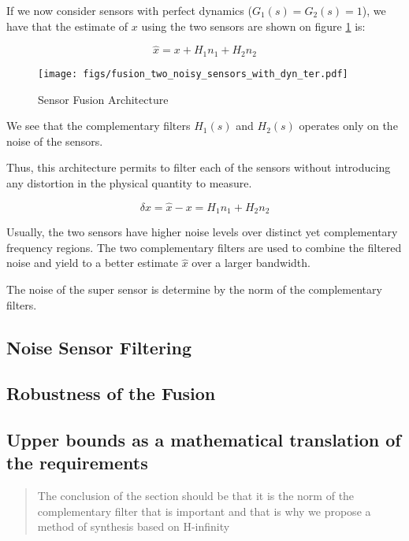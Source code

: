 \documentclass[9pt, technote, a4paper]{ieeeconf}
\begin{document}
If we now consider sensors with perfect dynamics (\(G_1(s) = G_2(s) = 1\)), we have that the estimate of \(x\) using the two sensors are shown on figure \ref{fig:fusion_two_noisy_sensors_with_dyn_ter} is:

\begin{equation}
  \hat{x} = x + H_1 n_1 + H_2 n_2
\end{equation}

\begin{figure}[htbp]
\centering
\texttt{[image: figs/fusion\_two\_noisy\_sensors\_with\_dyn\_ter.pdf]}
\caption{\label{fig:fusion_two_noisy_sensors_with_dyn_ter}
Sensor Fusion Architecture}
\end{figure}

We see that the complementary filters \(H_1(s)\) and \(H_2(s)\) operates only on the noise of the sensors.

Thus, this architecture permits to filter each of the sensors without introducing any distortion in the physical quantity to measure.

\begin{equation}
  \delta x = \hat{x} - x = H_1 n_1 + H_2 n_2
\end{equation}

Usually, the two sensors have higher noise levels over distinct yet complementary frequency regions. The two complementary filters are used to combine the filtered noise and yield to a better estimate \(\hat{x}\) over a larger bandwidth.

The noise of the super sensor is determine by the norm of the complementary filters.

\subsection{Noise Sensor Filtering}
\label{sec:orgce86efa}


\subsection{Robustness of the Fusion}
\label{sec:orgc52988d}


\subsection{Upper bounds as a mathematical translation of the requirements}
\label{sec:org4ab877a}
\begin{quote}
The conclusion of the section should be that it is the norm of the complementary filter that is important and that is why we propose a method of synthesis based on H-infinity
\end{quote}
\end{document}
